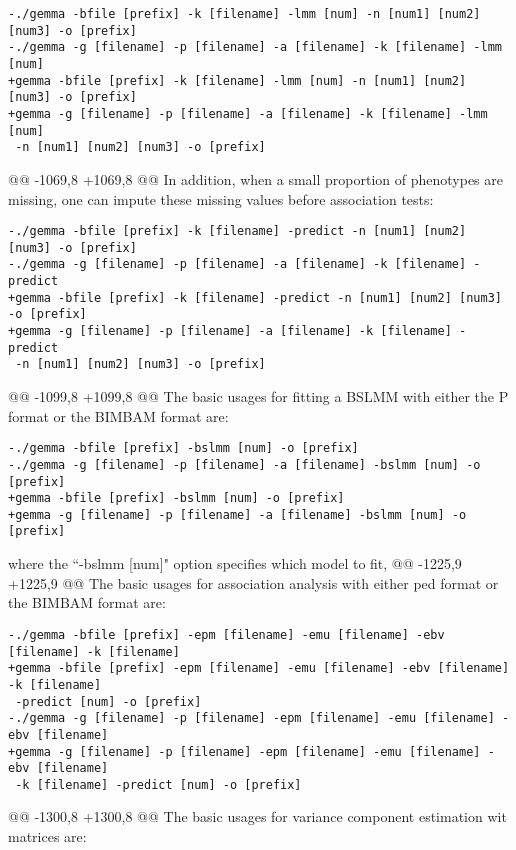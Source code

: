 \begin{verbatim}
-./gemma -bfile [prefix] -k [filename] -lmm [num] -n [num1] [num2] [num3] -o [prefix]
-./gemma -g [filename] -p [filename] -a [filename] -k [filename] -lmm [num]
+gemma -bfile [prefix] -k [filename] -lmm [num] -n [num1] [num2] [num3] -o [prefix]
+gemma -g [filename] -p [filename] -a [filename] -k [filename] -lmm [num]
 -n [num1] [num2] [num3] -o [prefix]
 \end{verbatim}
 
@@ -1069,8 +1069,8 @@ In addition, when a small proportion of phenotypes are
 missing, one can impute these missing values before association tests:
 
 \begin{verbatim}
-./gemma -bfile [prefix] -k [filename] -predict -n [num1] [num2] [num3] -o [prefix]
-./gemma -g [filename] -p [filename] -a [filename] -k [filename] -predict
+gemma -bfile [prefix] -k [filename] -predict -n [num1] [num2] [num3] -o [prefix]
+gemma -g [filename] -p [filename] -a [filename] -k [filename] -predict
 -n [num1] [num2] [num3] -o [prefix]
 \end{verbatim}
 
@@ -1099,8 +1099,8 @@ The basic usages for fitting a BSLMM with either the P
 format or the BIMBAM format are:
 
 \begin{verbatim}
-./gemma -bfile [prefix] -bslmm [num] -o [prefix]
-./gemma -g [filename] -p [filename] -a [filename] -bslmm [num] -o [prefix]
+gemma -bfile [prefix] -bslmm [num] -o [prefix]
+gemma -g [filename] -p [filename] -a [filename] -bslmm [num] -o [prefix]
 \end{verbatim}
 
 where the ``-bslmm [num]" option specifies which model to fit,
@@ -1225,9 +1225,9 @@ The basic usages for association analysis with either 
 ped format or the BIMBAM format are:
 
 \begin{verbatim}
-./gemma -bfile [prefix] -epm [filename] -emu [filename] -ebv [filename] -k [filename]
+gemma -bfile [prefix] -epm [filename] -emu [filename] -ebv [filename] -k [filename]
 -predict [num] -o [prefix]
-./gemma -g [filename] -p [filename] -epm [filename] -emu [filename] -ebv [filename]
+gemma -g [filename] -p [filename] -epm [filename] -emu [filename] -ebv [filename]
 -k [filename] -predict [num] -o [prefix]
 \end{verbatim}
 
@@ -1300,8 +1300,8 @@ The basic usages for variance component estimation wit
 matrices are:
 
